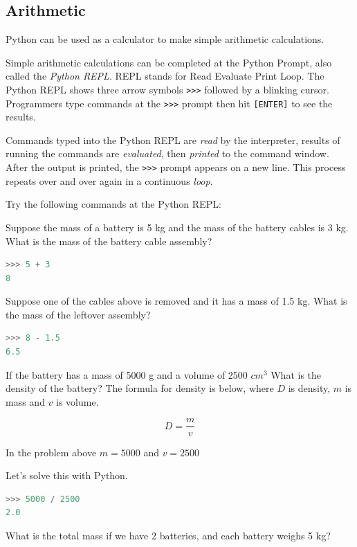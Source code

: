 \documentclass{book}
\begin{document}
    
        \subsection{Arithmetic}\label{arithmetic}

Python can be used as a calculator to make simple arithmetic
calculations.

Simple arithmetic calculations can be completed at the Python Prompt,
also called the \emph{Python REPL}. REPL stands for Read Evaluate Print
Loop. The Python REPL shows three arrow symbols \lstinline!>>>! followed
by a blinking cursor. Programmers type commands at the \lstinline!>>>!
prompt then hit \lstinline![ENTER]! to see the results.

Commands typed into the Python REPL are \emph{read} by the interpreter,
results of running the commands are \emph{evaluated}, then
\emph{printed} to the command window. After the output is printed, the
\lstinline!>>>! prompt appears on a new line. This process repeats over
and over again in a continuous \emph{loop}.

Try the following commands at the Python REPL:

Suppose the mass of a battery is 5 kg and the mass of the battery cables
is 3 kg. What is the mass of the battery cable assembly?

\begin{lstlisting}[language=Python]
>>> 5 + 3
8
\end{lstlisting}

Suppose one of the cables above is removed and it has a mass of 1.5 kg.
What is the mass of the leftover assembly?

\begin{lstlisting}[language=Python]
>>> 8 - 1.5
6.5
\end{lstlisting}

If the battery has a mass of 5000 g and a volume of 2500 \(cm^3\) What
is the density of the battery? The formula for density is below, where
\(D\) is density, \(m\) is mass and \(v\) is volume.

\[ D = \frac{m}{v} \]

In the problem above \(m = 5000\) and \(v=2500\)

Let's solve this with Python.

\begin{lstlisting}[language=Python]
>>> 5000 / 2500
2.0
\end{lstlisting}

What is the total mass if we have 2 batteries, and each battery weighs 5
kg?
\end{document}

